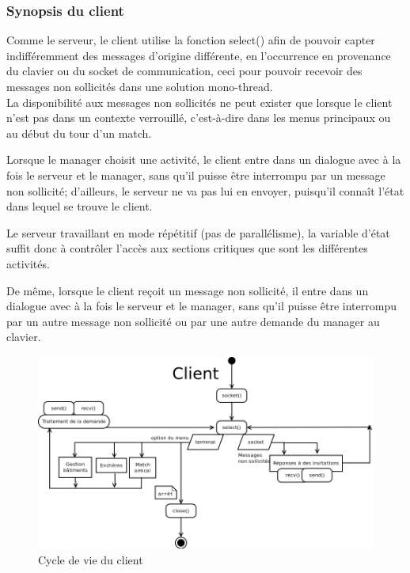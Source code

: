 \documentclass[a4paper,titlepage]{scrreprt}
\begin{document}
  \subsubsection{Synopsis du client}
Comme le serveur, le client utilise la fonction select() afin de pouvoir capter indifféremment des messages d'origine différente,
 en l’occurrence en provenance du clavier ou du socket de communication, ceci pour pouvoir recevoir des messages non sollicités dans une solution mono-thread.\\
 La disponibilité aux messages non sollicités ne peut exister que lorsque le client
 n'est pas dans un contexte verrouillé, c'est-à-dire dans les menus principaux ou au début du tour d'un match.
 
 Lorsque le manager choisit une activité, le client entre dans un dialogue avec à la fois le serveur et le manager,
 sans qu'il puisse être interrompu par un message non sollicité; d'ailleurs, le serveur ne va pas lui en envoyer,
 puisqu'il connaît l'état dans lequel se trouve le client.
 
 Le serveur travaillant en mode répétitif (pas de parallélisme), la variable d'état suffit donc à contrôler l'accès
 aux sections critiques que sont les différentes activités.
 
 De même, lorsque le client reçoit un message non sollicité, il entre dans un dialogue avec à la fois le serveur et le manager,
 sans qu'il puisse être interrompu par un autre message non sollicité ou par une autre demande du manager au clavier.
 
  \begin{figure}[H]
    \center
    \includegraphics[scale=0.5]{uml/Client.png}
    \caption{Cycle de vie du client}
  \end{figure}
 
\end{document}
